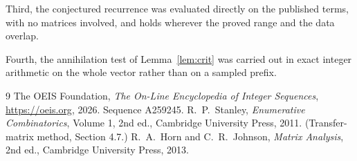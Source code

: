 \documentclass[11pt,a4paper]{article}
\theoremstyle{plain}
\theoremstyle{definition}
\begin{document}
Third, the conjectured recurrence was evaluated directly on the published terms, with no
matrices involved, and holds wherever the proved range and the data overlap.

Fourth, the annihilation test of Lemma~\ref{lem:crit} was carried out in exact integer
arithmetic on the whole vector rather than on a sampled prefix.

\begin{thebibliography}{9}
 The OEIS Foundation, \emph{The On-Line Encyclopedia of Integer
Sequences}, \url{https://oeis.org}, 2026. Sequence A259245.
 R.~P.~Stanley, \emph{Enumerative Combinatorics}, Volume 1, 2nd ed.,
Cambridge University Press, 2011. (Transfer-matrix method, Section 4.7.)
 R.~A.~Horn and C.~R.~Johnson, \emph{Matrix Analysis}, 2nd ed., Cambridge
University Press, 2013.
\end{thebibliography}
\end{document}
